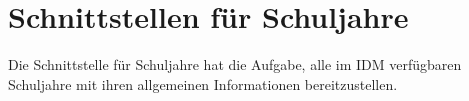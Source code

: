 \section{Schnittstellen für Schuljahre}
Die Schnittstelle für Schuljahre hat die Aufgabe, alle im IDM verfügbaren Schuljahre mit ihren allgemeinen Informationen bereitzustellen.


%

%
%